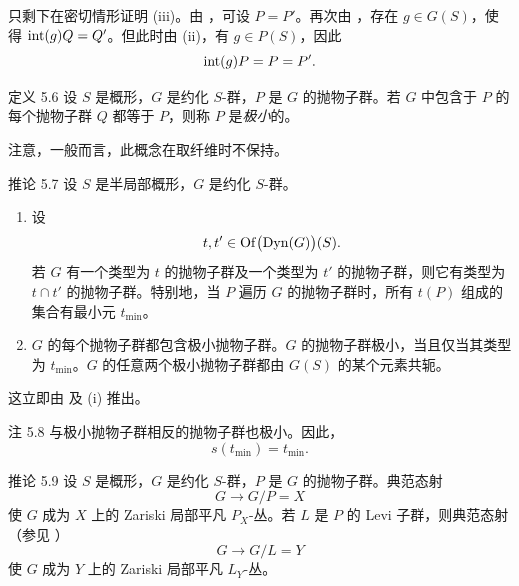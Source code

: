只剩下在密切情形证明 \textup{(iii)}。由 ，可设 \(P=P'\)。再次由 ，存在 \(g\in G(S)\)，使得 \(\operatorname{int}(g)Q=Q'\)。但此时由 \textup{(ii)}，有 \(g\in P(S)\)，因此
\[
 \operatorname{int}(g)P=P=P'.
\]
\SGAQED


\begin{sgastatement}{定义 5.6}
设 \(S\) 是概形，\(G\) 是约化 \(S\)-群，\(P\) 是 \(G\) 的抛物子群。若 \(G\) 中包含于 \(P\) 的每个抛物子群 \(Q\) 都等于 \(P\)，则称 \(P\) 是\emph{极小}的。
\end{sgastatement}

注意，一般而言，此概念在取纤维时不保持。

\begin{sgastatement}{推论 5.7}
设 \(S\) 是半局部概形，\(G\) 是约化 \(S\)-群。
\begin{enumerate}[label=\textup{(\roman*)}]
\item 设
\[
 t,t'\in\operatorname{Of}\bigl(\operatorname{Dyn}(G)\bigr)(S).
\]
若 \(G\) 有一个类型为 \(t\) 的抛物子群及一个类型为 \(t'\) 的抛物子群，则它有类型为 \(t\cap t'\) 的抛物子群。特别地，当 \(P\) 遍历 \(G\) 的抛物子群时，所有 \(t(P)\) 组成的集合有最小元 \(t_{\min}\)。
\item \(G\) 的每个抛物子群都包含极小抛物子群。\(G\) 的抛物子群极小，当且仅当其类型为 \(t_{\min}\)。\(G\) 的任意两个极小抛物子群都由 \(G(S)\) 的某个元素共轭。
\end{enumerate}
\end{sgastatement}

这立即由  及 \textup{(i)} 推出。

\begin{sgastatement}{注 5.8}
与极小抛物子群相反的抛物子群也极小。因此，
\[
 s(t_{\min})=t_{\min}.
\]
\end{sgastatement}

\begin{sgastatement}{推论 5.9}
设 \(S\) 是概形，\(G\) 是约化 \(S\)-群，\(P\) 是 \(G\) 的抛物子群。典范态射
\[
 G\longrightarrow G/P=X
\]
使 \(G\) 成为 \(X\) 上的 Zariski 局部平凡 \(P_X\)-丛。若 \(L\) 是 \(P\) 的 Levi 子群，则典范态射 \textup{（参见 ）}
\[
 G\longrightarrow G/L=Y
\]
使 \(G\) 成为 \(Y\) 上的 Zariski 局部平凡 \(L_Y\)-丛。
\end{sgastatement}

